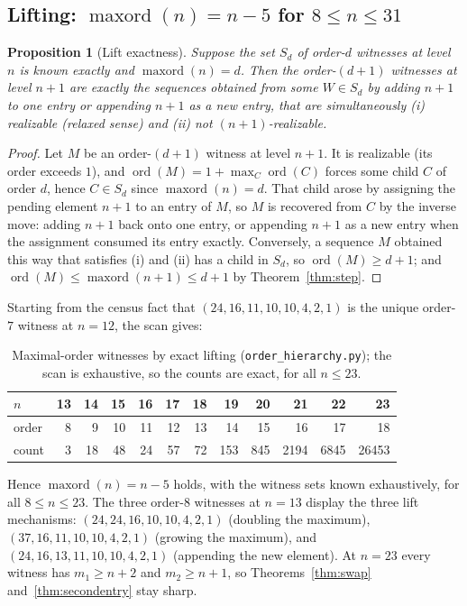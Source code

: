 \documentclass[11pt]{article}
\newtheorem{proposition}[theorem]{Proposition}
\theoremstyle{definition}
\theoremstyle{remark}
\newcommand{\ord}{\operatorname{ord}}
\newcommand{\maxord}{\operatorname{maxord}}
\begin{document}
\subsection{Lifting: $\maxord(n)=n-5$ for $8\le n\le31$}

\begin{proposition}[Lift exactness]\label{prop:lift}
Suppose the set $S_d$ of order-$d$ witnesses at level $n$ is known exactly and
$\maxord(n)=d$. Then the order-$(d{+}1)$ witnesses at level $n+1$ are exactly the
sequences obtained from some $W\in S_d$ by adding $n+1$ to one entry or appending
$n+1$ as a new entry, that are simultaneously (i) realizable (relaxed sense) and
(ii) not $(n{+}1)$-realizable.
\end{proposition}

\begin{proof}
Let $M$ be an order-$(d{+}1)$ witness at level $n+1$. It is realizable (its
order exceeds $1$), and $\ord(M)=1+\max_{C}\ord(C)$ forces some child $C$ of
order $d$, hence $C\in S_d$ since $\maxord(n)=d$. That child arose by assigning
the pending element $n+1$ to an entry of $M$, so $M$ is recovered from $C$ by
the inverse move: adding $n+1$ back onto one entry, or appending $n+1$ as a new
entry when the assignment consumed its entry exactly. Conversely, a sequence
$M$ obtained this way that satisfies (i) and (ii) has a child in $S_d$, so
$\ord(M)\ge d+1$; and $\ord(M)\le\maxord(n+1)\le d+1$ by
Theorem~\ref{thm:step}.
\end{proof}

Starting from the census fact that $(24,16,11,10,10,4,2,1)$ is the unique order-$7$
witness at $n=12$, the scan gives:

\begin{table}[ht]
\centering
\caption{Maximal-order witnesses by exact lifting (\texttt{order\_hierarchy.py}); the scan is
exhaustive, so the counts are exact, for all $n\le23$.}
\label{tab:lift}
\begin{tabular}{@{}lrrrrrrrrrrr@{}}
\toprule
$n$ & 13 & 14 & 15 & 16 & 17 & 18 & 19 & 20 & 21 & 22 & 23 \\
\midrule
order & 8 & 9 & 10 & 11 & 12 & 13 & 14 & 15 & 16 & 17 & 18 \\
count & 3 & 18 & 48 & 24 & 57 & 72 & 153 & 845 & 2194 & 6845 & 26453 \\
\bottomrule
\end{tabular}
\end{table}

\noindent Hence $\maxord(n)=n-5$ holds, with the witness sets known exhaustively,
for all $8\le n\le23$. The three order-$8$ witnesses at $n=13$ display the three
lift mechanisms: $(24,24,16,10,10,4,2,1)$ (doubling the maximum),
$(37,16,11,10,10,4,2,1)$ (growing the maximum), and $(24,16,13,11,10,10,4,2,1)$
(appending the new element). At $n=23$ every witness has $m_1\ge n+2$ and
$m_2\ge n+1$, so Theorems~\ref{thm:swap} and~\ref{thm:secondentry} stay sharp.
\end{document}
